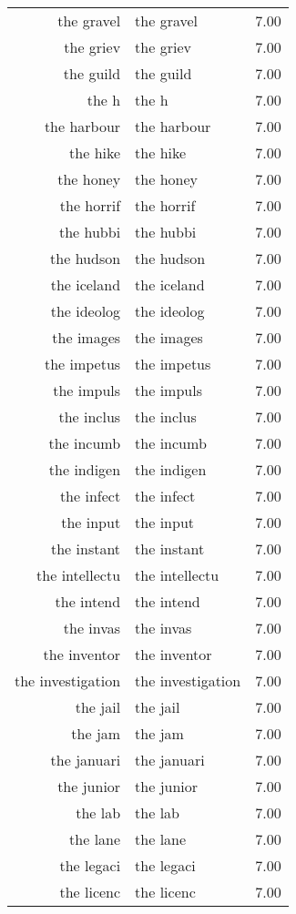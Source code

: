 \begin{table}[ht]
\begin{tabular}{rlr}
  the gravel & the gravel & 7.00 \\ 
  the griev & the griev & 7.00 \\ 
  the guild & the guild & 7.00 \\ 
  the h & the h & 7.00 \\ 
  the harbour & the harbour & 7.00 \\ 
  the hike & the hike & 7.00 \\ 
  the honey & the honey & 7.00 \\ 
  the horrif & the horrif & 7.00 \\ 
  the hubbi & the hubbi & 7.00 \\ 
  the hudson & the hudson & 7.00 \\ 
  the iceland & the iceland & 7.00 \\ 
  the ideolog & the ideolog & 7.00 \\ 
  the images & the images & 7.00 \\ 
  the impetus & the impetus & 7.00 \\ 
  the impuls & the impuls & 7.00 \\ 
  the inclus & the inclus & 7.00 \\ 
  the incumb & the incumb & 7.00 \\ 
  the indigen & the indigen & 7.00 \\ 
  the infect & the infect & 7.00 \\ 
  the input & the input & 7.00 \\ 
  the instant & the instant & 7.00 \\ 
  the intellectu & the intellectu & 7.00 \\ 
  the intend & the intend & 7.00 \\ 
  the invas & the invas & 7.00 \\ 
  the inventor & the inventor & 7.00 \\ 
  the investigation & the investigation & 7.00 \\ 
  the jail & the jail & 7.00 \\ 
  the jam & the jam & 7.00 \\ 
  the januari & the januari & 7.00 \\ 
  the junior & the junior & 7.00 \\ 
  the lab & the lab & 7.00 \\ 
  the lane & the lane & 7.00 \\ 
  the legaci & the legaci & 7.00 \\ 
  the licenc & the licenc & 7.00 \\ 

\end{tabular}
\end{table}
